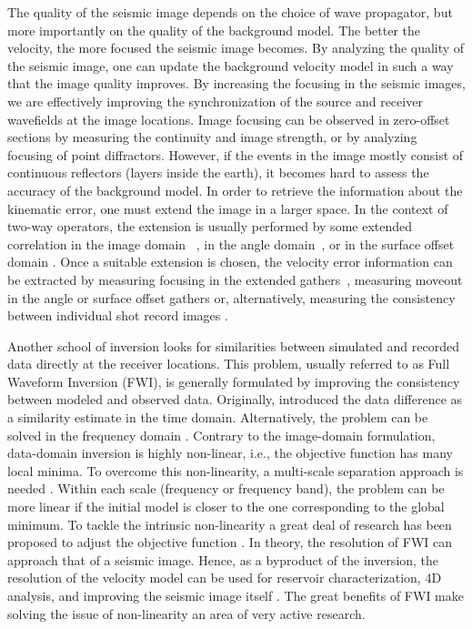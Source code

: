 The quality of the seismic image depends on the choice of wave
propagator, but more importantly on the quality of the background
model. The better the velocity, the more focused the seismic
image becomes. By analyzing the quality of the seismic image, one
can update the background velocity model in such a way that the
image quality improves. By increasing the focusing in the seismic
images, we are effectively improving the synchronization of the
source and receiver wavefields at the image locations. Image
focusing can be observed in zero-offset sections by measuring the
continuity and image strength, or by analyzing focusing of point
diffractors. However, if the events in the image mostly consist
of continuous reflectors (layers inside the earth), it becomes
hard to assess the accuracy of the background model. In order to
retrieve the information about the kinematic error, one must extend
the image in a larger space. In the context of two-way operators,
the extension is usually performed by some extended correlation
in the image domain ~\citep{rickett:883,sava:S209,GPR:GPR888},
in the angle domain~\citep{sava:1065,yoon,Jin,yoon2,Vyas},
or in the surface offset domain \citep{giboli}. Once a
suitable extension is chosen, the velocity error information
can be extracted by measuring focusing in the extended
gathers~\citep{ShenSymes.geo.2008,Wiktor,tony_seg:cwp12,Shan:chevron,
BiondiAli:2014,diaz2015,tony:gp15}, measuring moveout in the
angle or surface offset gathers \citep{Liu2010,yiShen,Fleury} or,
alternatively, measuring the consistency between individual shot
record images \citep{perrone2015waveform}.

Another school of inversion looks for similarities between simulated
and recorded data directly at the receiver locations. This problem,
usually referred to as Full Waveform Inversion (FWI), is generally
formulated by improving the consistency between modeled and observed
data. Originally, \cite{tarantola} introduced the data difference
as a similarity estimate in the time domain. Alternatively, the
problem can be solved in the frequency domain \citep{Pratt99}.
Contrary to the image-domain formulation, data-domain inversion
is highly non-linear, i.e., the objective function has many
local minima. To overcome this non-linearity, a multi-scale
separation approach is needed \citep{Bunks95}. Within each scale
(frequency or frequency band), the problem can be more linear
if the initial model is closer to the one corresponding to the
global minimum. To tackle the intrinsic non-linearity a great deal
of research has been proposed to adjust the objective function
\citep{ShinHa.geo.2008,shin_cha,Sirgue,engquist2013application,Luo91,
warner,TariqChoi}. In theory, the resolution of FWI can approach
that of a seismic image. Hence, as a byproduct of the inversion,
the resolution of the velocity model can be used for reservoir
characterization, 4D analysis, and improving the seismic image itself
\cite{sirgue20093d}. The great benefits of FWI make solving the issue
of non-linearity an area of very active research.


